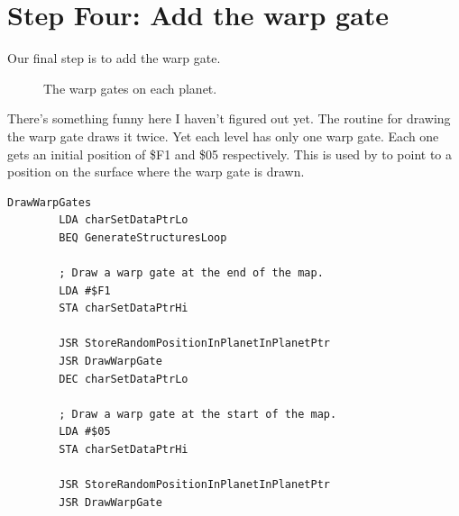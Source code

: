 \section{Step Four: Add the warp gate}

Our final step is to add the warp gate.
\begin{figure}[H]
  {
    \setlength{\tabcolsep}{3.0pt}
    \setlength\cmidrulewidth{\heavyrulewidth} %
    \begin{adjustbox}{width=15cm,center}
      \begin{subfigure}{0.3\textwidth}
        
      \end{subfigure}
      \begin{subfigure}{0.3\textwidth}
        
      \end{subfigure}
      \begin{subfigure}{0.3\textwidth}
        
      \end{subfigure}
      \begin{subfigure}{0.3\textwidth}
        
      \end{subfigure}
      \begin{subfigure}{0.3\textwidth}
        
      \end{subfigure}
    \end{adjustbox}
  }\caption[]{The warp gates on each planet.}
\end{figure}

There's something funny here I haven't figured out yet. The routine for drawing the warp gate
draws it twice. Yet each level has only one warp gate. Each one gets an initial position of
\$F1 and \$05 respectively. This is used by  to 
point to a position on the surface where the warp gate is drawn.

\begin{lstlisting}[caption=Why does it draw 2 warp gates when there's only 1? Haven't figured this out yet..]
DrawWarpGates   
        LDA charSetDataPtrLo
        BEQ GenerateStructuresLoop

        ; Draw a warp gate at the end of the map.
        LDA #$F1
        STA charSetDataPtrHi

        JSR StoreRandomPositionInPlanetInPlanetPtr
        JSR DrawWarpGate
        DEC charSetDataPtrLo

        ; Draw a warp gate at the start of the map.
        LDA #$05
        STA charSetDataPtrHi

        JSR StoreRandomPositionInPlanetInPlanetPtr
        JSR DrawWarpGate
\end{lstlisting}

